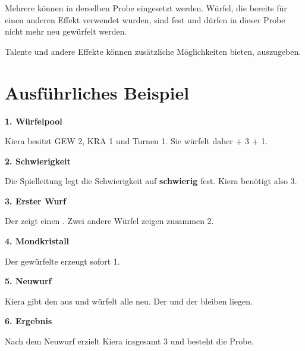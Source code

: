 Mehrere \crystal{} können in derselben Probe eingesetzt werden. Würfel, die bereits für einen anderen Effekt verwendet wurden, sind fest und dürfen in dieser Probe nicht mehr neu gewürfelt werden.

Talente und andere Effekte können zusätzliche Möglichkeiten bieten, \crystal{} auszugeben.

\section{Ausführliches Beispiel}

\begin{beispiel}[title=Eine schwierige Turnen-Probe]
\textbf{1. Würfelpool}

Kiera besitzt GEW 2, KRA 1 und Turnen 1. Sie würfelt daher \heroDie{} + 3\greenDie{} + 1\blueDie.

\textbf{2. Schwierigkeit}

Die Spielleitung legt die Schwierigkeit auf \textbf{schwierig} fest. Kiera benötigt also 3\star.

\textbf{3. Erster Wurf}

Der \heroDie{} zeigt einen \moon. Zwei andere Würfel zeigen zusammen 2\star.

\textbf{4. Mondkristall}

Der gewürfelte \moon{} erzeugt sofort 1\crystal.

\textbf{5. Neuwurf}

Kiera gibt den \crystal{} aus und würfelt alle \greenDie{} neu. Der \heroDie{} und der \blueDie{} bleiben liegen.

\textbf{6. Ergebnis}

Nach dem Neuwurf erzielt Kiera insgesamt 3\star{} und besteht die Probe.
\end{beispiel}
